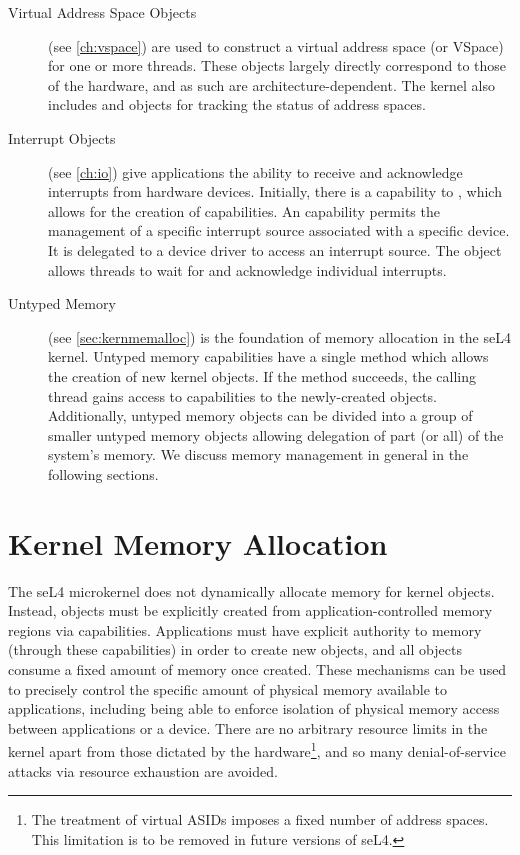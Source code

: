 \begin{description}
    \item[Virtual Address Space Objects] (see \autoref{ch:vspace}) 
    are used to construct a virtual
    address space (or VSpace) for one or more threads. These
    objects largely directly correspond to those of the hardware, and
    as such are architecture-dependent. The kernel also includes  and  objects for tracking the status of
    address spaces.

    \item[Interrupt Objects] (see \autoref{ch:io}) give applications the ability to receive
    and acknowledge interrupts from hardware devices.
    Initially, there is a capability to ,
    which allows for the creation of  capabilities.
    An  capability permits the management of a specific 
    interrupt source associated with a specific device.
    It is delegated to
    a device driver to access an interrupt source. The 
    object allows threads to wait for and acknowledge individual
    interrupts.

    \item[Untyped Memory] (see \autoref{sec:kernmemalloc}) is the foundation of memory allocation
    in the seL4 kernel.  Untyped memory capabilities have a single method
    which allows the creation of new kernel objects. If the method
    succeeds, the calling thread gains access to capabilities to the
    newly-created objects. Additionally, untyped memory objects can be
    divided into a group of smaller untyped memory objects allowing
    delegation of part (or all) of the system's memory.  We discuss
    memory management in general in the following sections.

\end{description}

\section{Kernel Memory Allocation}
\label{sec:kernmemalloc}

The seL4 microkernel does not dynamically allocate memory for kernel objects.
Instead, objects must be explicitly created from application-controlled memory
regions via  capabilities.  Applications must have
explicit authority to memory (through these  capabilities) in
order to create new objects, and all objects consume a fixed amount of memory once
created. These mechanisms can be used to precisely control
the specific amount of physical memory available to applications,
including being able to enforce isolation of physical memory access
between applications or a device.  There are no arbitrary resource
limits in the kernel apart from those dictated by the
hardware\footnote{The treatment of virtual ASIDs imposes a fixed number
of address spaces. This limitation is to be removed in future
versions of seL4.}, and so many denial-of-service attacks via resource
exhaustion are avoided.

